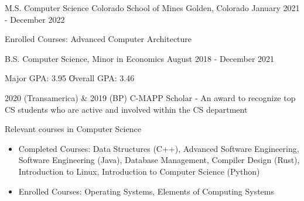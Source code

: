 \vspace{-2.0mm}


\begin{cventries}


\cventry
    {M.S. Computer Science }
    {Colorado School of Mines} %
    {Golden, Colorado} %
    {January 2021 - December 2022} %
    {
      \begin{cvitems}
        \item {Enrolled Courses: Advanced Computer Architecture}
      \end{cvitems}
    }
    {}
    \vspace{-1.0mm}
  \cventry
    {B.S. Computer Science, Minor in Economics}
    {} %
    {} %
    {August 2018 - December 2021} %
    {
      \begin{cvitems} %
        \item {Major GPA: 3.95 \| Overall GPA: 3.46}
    \item {2020 (Transamerica) \& 2019 (BP) C-MAPP Scholar - An award to recognize top CS students who are active and involved within the CS department}
        \ifcv
        \item{Relevant courses in Computer Science}
        \begin{itemize}
          \item {Completed Courses: Data Structures (C++), Advanced Software Engineering, Software Engineering (Java), Database Management, Compiler Design (Rust), Introduction to Linux, Introduction to Computer Science (Python)}
          \item {Enrolled Courses: Operating Systems, Elements of Computing Systems}

\end{itemize}
\end{cvitems}}
\end{cventries}
